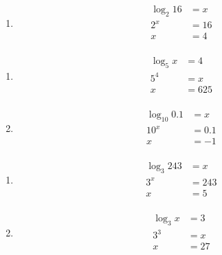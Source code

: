 \documentclass{exam}
\begin{document}
\begin{description}
\begin{enumerate}[a]
        \item 
          \begin{align*}
            \log_2 16 &= x \\
            2^x       &= 16 \\
            x         &= 4 \\
          \end{align*}
      \end{enumerate}

    \item[26]
      \begin{enumerate}[a]
        \item 
          \begin{align*}
            \log_5 x &= 4 \\
            5^4      &= x \\
            x        &= 625 \\
          \end{align*}

        \item 
          \begin{align*}
            \log_{10} 0.1 &= x \\
            10^x          &= 0.1 \\
            x             &= -1 \\
          \end{align*}
      \end{enumerate}

    \item[27]
      \begin{enumerate}[a]
        \item 
          \begin{align*}
            \log_3 243 &= x \\
            3^x        &= 243 \\
            x          &= 5 \\
          \end{align*}

        \item 
          \begin{align*}
            \log_3 x &= 3 \\
            3^3      &= x \\
            x        &= 27 \\
          \end{align*}
      \end{enumerate}


\end{description}
\end{document}
